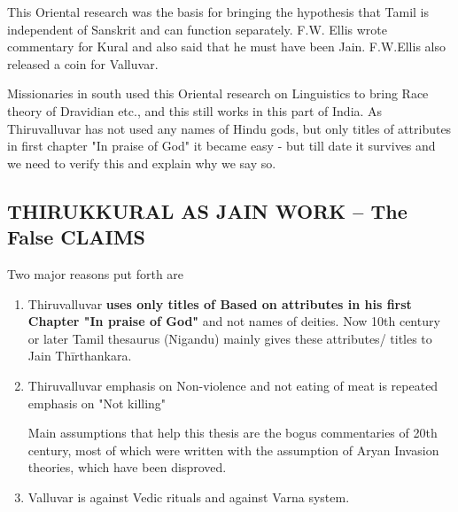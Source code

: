 This Oriental research was the basis for bringing the hypothesis that Tamil is independent of Sanskrit and can function separately. F.W. Ellis wrote commentary for Kural and also said that he must have been Jain. F.W.Ellis also released a coin for Valluvar.

Missionaries in south used this Oriental research on Linguistics to bring Race theory of Dravidian etc., and this still works in this part of India. As Thiruvalluvar has not used any names of Hindu gods, but only titles of attributes in first chapter "In praise of God" it became easy - but till date it survives and we need to verify this and explain why we say so.

\subsection*{THIRUKKURAL AS JAIN WORK – The False CLAIMS}

Two major reasons put forth are

\begin{enumerate}[{\rm 1)}]
\itemsep=0pt
\item Thiruvalluvar \textbf{uses only titles of Based on attributes in his first Chapter "In praise of God"} and not names of deities. Now 10th century or later Tamil thesaurus (Nigandu) mainly gives these attributes/ titles to Jain Thīrthankara.

 \item 
 Thiruvalluvar emphasis on Non-violence and not eating of meat is repeated emphasis on "Not killing"

 Main assumptions that help this thesis are the bogus commentaries of 20th century, most of which were written with the assumption of Aryan Invasion theories, which have been disproved.

 \item Valluvar is against Vedic rituals and against Varna system.

\end{enumerate}



